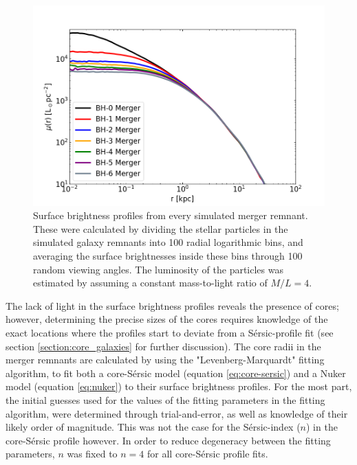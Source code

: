 \documentclass[english, twoside]{HYgradu}
\begin{document}
\begin{figure}
	\centering
	\includegraphics[width=\textwidth]{SurfaceBrightnessProfiles.png}
	\caption{Surface brightness profiles from every simulated merger remnant. These were calculated by dividing the stellar particles in the simulated galaxy remnants into 100 radial logarithmic bins, and averaging the surface brightnesses inside these bins through 100 random viewing angles. The luminosity of the particles was estimated by assuming a constant mass-to-light ratio of $M/L = 4$.}
	\label{figure:surface_brightness}
\end{figure}

The lack of light in the surface brightness profiles reveals the presence of cores; however, determining the precise sizes of the cores requires knowledge of the exact locations where the profiles start to deviate from a Sérsic-profile fit (see section \ref{section:core_galaxies} for further discussion). The core radii in the merger remnants are calculated by using the "Levenberg-Marquardt" fitting algorithm, to fit both a core-Sérsic model (equation \ref{eq:core-sersic}) and a Nuker model (equation \ref{eq:nuker}) to their surface brightness profiles. For the most part, the initial guesses used for the values of the fitting parameters in the fitting algorithm, were determined through trial-and-error, as well as knowledge of their likely order of magnitude. This was not the case for the Sérsic-index ($n$) in the core-Sérsic profile however. In order to reduce degeneracy between the fitting parameters, $n$ was fixed to $n=4$ for all core-Sérsic profile fits.
\end{document}
